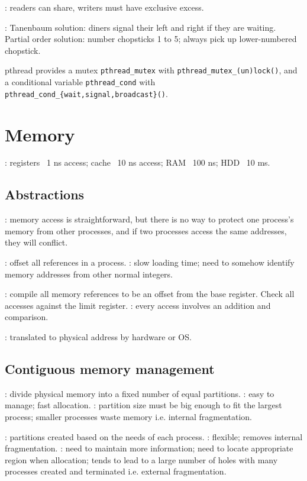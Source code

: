 \documentclass[fontsize=9pt]{slnotes}
\newcommand\benefits{\checkmark}
\newcommand\problems{\textsymbol{✗}}
\begin{document}
: readers can share, writers must have exclusive excess.

: Tanenbaum solution: diners signal their left and right if they are waiting. Partial order solution: number chopsticks 1 to 5; always pick up lower-numbered chopstick.

pthread provides a mutex \texttt{pthread\_mutex} with \texttt{pthread\-\_\-mutex\-\_\-(un)lock()}, and a conditional variable \texttt{pthread\_cond} with \texttt{pthread\-\_\-cond\-\_\-\{wait\-,\-signal\-,\-broadcast\}()}.

\chapter{Memory}
: registers ~1 ns access; cache ~10 ns access; RAM ~100 ns; HDD ~10 ms.

\section{Abstractions}
: memory access is straightforward, but there is no way to protect one process's memory from other processes, and if two processes access the same addresses, they will conflict.

: offset all references in a process. \problems: slow loading time; need to somehow identify memory addresses from other normal integers.

: compile all memory references to be an offset from the base register. Check all accesses against the limit register. \problems: every access involves an addition and comparison.

: translated to physical address by hardware or OS.

\section{Contiguous memory management}
: divide physical memory into a fixed number of equal partitions. \benefits: easy to manage; fast allocation. \problems: partition size must be big enough to fit the largest process; smaller processes waste memory i.e. internal fragmentation.

: partitions created based on the needs of each process. \benefits: flexible; removes internal fragmentation. \problems: need to maintain more information; need to locate appropriate region when allocation; tends to lead to a large number of holes with many processes created and terminated i.e. external fragmentation.
\end{document}
